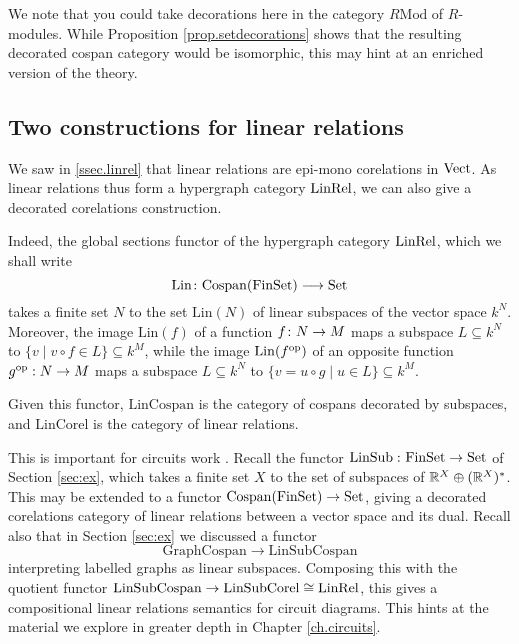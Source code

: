 We note that you could take decorations here in the category $R\mathrm{Mod}$ of
$R$-modules. While Proposition \ref{prop.setdecorations} shows that the
resulting decorated cospan category would be isomorphic, this may hint at an
enriched version of the theory.

\subsection{Two constructions for linear relations}

We saw in \textsection\ref{ssec.linrel} that linear relations are epi-mono
corelations in $\mathrm{Vect}$. As linear relations thus form a hypergraph category
$\mathrm{LinRel}$, we can also give a decorated corelations construction. 

Indeed, the global sections functor of the hypergraph category $\mathrm{LinRel}$, which
we shall write
\[
  \mathrm{Lin} {\colon}\mathrm{Cospan}(\mathrm{FinSet}) \longrightarrow \mathrm{Set}
\]
takes a finite set $N$ to the set $\mathrm{Lin}(N)$ of linear subspaces of the
vector space $k^N$. Moreover, the image $\mathrm{Lin}(f)$ of a function $f{\colon}
N \to M$ maps a subspace $L \subseteq k^N$ to $\{v \mid v\circ f \in L\}
\subseteq k^M$, while the image $\mathrm{Lin}(f^{\mathrm{op}})$ of an opposite function
$g^{\mathrm{op}}: N \to M$ maps a subspace $L \subseteq k^N$ to $\{v = u \circ g \mid u
\in L\} \subseteq k^M$. 

Given this functor, $\mathrm{LinCospan}$ is the category of cospans decorated by
subspaces, and $\mathrm{LinCorel}$ is the category of linear relations. 

This is important for circuits work \cite{BF,BSZ}. Recall the functor
$\operatorname{LinSub}{\colon} \mathrm{FinSet} \to \mathrm{Set}$ of Section \ref{sec:ex}, which takes a finite
set $X$ to the set of subspaces of ${\mathbb{R}}^X \oplus ({\mathbb{R}}^X)^*$.  This may be extended
to a functor $\operatorname{{Cospan}}(\mathrm{FinSet}) \to \mathrm{Set}$, giving a decorated corelations
category of linear relations between a vector space and its dual. Recall also
that in Section \ref{sec:ex} we discussed a functor 
\[
  \mathrm{GraphCospan} \to \mathrm{LinSubCospan}
\]
interpreting labelled graphs as linear subspaces. Composing this with the
quotient functor $\mathrm{LinSubCospan} \to \mathrm{LinSubCorel}\cong \mathrm{LinRel}$,
this gives a compositional linear relations semantics for circuit diagrams. This
hints at the material we explore in greater depth in Chapter \ref{ch.circuits}.



%
%
%







